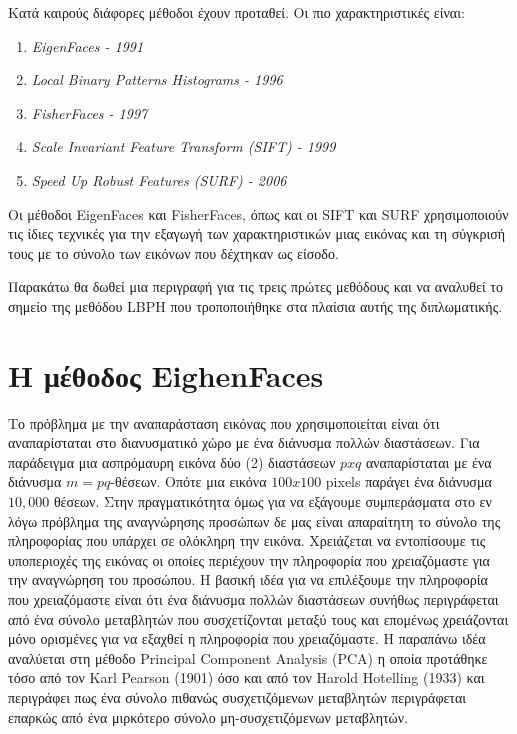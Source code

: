 Κατά καιρούς διάφορες μέθοδοι έχουν προταθεί. Οι πιο χαρακτηριστικές είναι:

\begin{enumerate}
    \item \emph{EigenFaces - 1991 ~\cite{}}
  \item \emph{Local Binary Patterns Histograms - 1996 ~\cite{}}
  \item \emph{FisherFaces - 1997 ~\cite{}}
  \item \emph{Scale Invariant Feature Transform (SIFT) - 1999 ~\cite{}}
  \item \emph{Speed Up Robust Features (SURF) - 2006 ~\cite{}}
\end{enumerate}

Οι μέθοδοι EigenFaces και FisherFaces, όπως και οι SIFT και SURF χρησιμοποιούν
τις ίδιες τεχνικές για την εξαγωγή των χαρακτηριστικών μιας εικόνας και τη σύγκρισή
τους με το σύνολο των εικόνων που δέχτηκαν ως είσοδο.

Παρακάτω θα δωθεί μια περιγραφή για τις τρεις πρώτες μεθόδους και να αναλυθεί
το σημείο της μεθόδου LBPH που τροποποιήθηκε στα πλαίσια αυτής της διπλωματικής.


\section{H μέθοδος EighenFaces}\label{sec:eigen}

Το πρόβλημα με την αναπαράσταση εικόνας που χρησιμοποιείται είναι ότι αναπαρίσταται
στο διανυσματικό χώρο με ένα διάνυσμα πολλών διαστάσεων. Για παράδειγμα μια ασπρόμαυρη
εικόνα δύο (2) διαστάσεων $p x q$ αναπαρίσταται με ένα διάνυσμα $m=pq$-θέσεων.
Οπότε μια εικόνα $100 x 100$ pixels παράγει ένα διάνυσμα $10,000$ θέσεων.
Στην πραγματικότητα όμως για να εξάγουμε συμπεράσματα στο εν λόγω πρόβλημα της
αναγνώρησης προσώπων δε μας είναι απαραίτητη το σύνολο της πληροφορίας που υπάρχει
σε ολόκληρη την εικόνα. Χρειάζεται να εντοπίσουμε τις υποπεριοχές της
εικόνας οι οποίες περιέχουν την πληροφορία που χρειαζόμαστε για την αναγνώρηση
του προσώπου. Η βασική ιδέα για να επιλέξουμε την πληροφορία που χρειαζόμαστε είναι
ότι ένα διάνυσμα πολλών διαστάσεων συνήθως περιγράφεται από ένα σύνολο μεταβλητών
που συσχετίζονται μεταξύ τους και επομένως χρειάζονται μόνο ορισμένες για να εξαχθεί
η πληροφορία που χρειαζόμαστε. Η παραπάνω ιδέα αναλύεται στη μέθοδο
Principal Component Analysis (PCA) η οποία προτάθηκε τόσο από τον Karl Pearson
\cite{} (1901) όσο και από τον Harold Hotelling \cite{} (1933) και περιγράφει
πως ένα σύνολο πιθανώς συσχετιζόμενων μεταβλητών περιγράφεται επαρκώς από ένα
μιρκότερο σύνολο μη-συσχετιζόμενων μεταβλητών.

